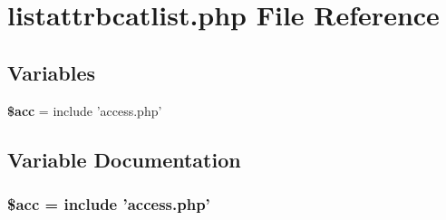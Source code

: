 \section{listattrbcatlist.php File Reference}
\label{listattrbcatlist_8php}


\subsection*{Variables}
\begin{CompactItemize}
\item 
{\bf \$acc} = include 'access.php'
\end{CompactItemize}


\subsection{Variable Documentation}
\subsubsection{\setlength{\rightskip}{0pt plus 5cm}\$acc = include 'access.php'}\label{listattrbcatlist_8php_542926c588a05eb69553d79c83cf73da}


